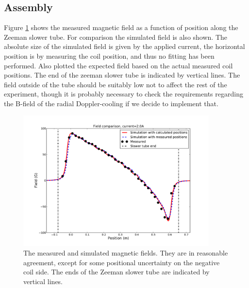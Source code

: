 \documentclass[12pt,a4paper]{article}
\begin{document}
\subsection{Assembly}

Figure \ref{fig:slowerfield} shows the measured magnetic field as a function of position along the Zeeman slower tube. For comparison the simulated field is also shown. The absolute size of the simulated field is given by the applied current, the horizontal position is by measuring the coil position, and thus no fitting has been performed. Also plotted the expected field based on the actual measured coil positions. The end of the zeeman slower tube is indicated by vertical lines. The field outside of the tube should be suitably low not to affect the rest of the experiment, though it is probably necessary to check the requirements regarding the B-field of the radial Doppler-cooling if we decide to implement that.

\begin{figure}[htb]
\centering
\includegraphics[width=0.9\textwidth]{slowerfield3}
\caption{The measured and simulated magnetic fields. They are in reasonable agreement, except for some positional uncertainty on the negative coil side. The ends of the Zeeman slower tube are indicated by vertical lines.}
\label{fig:slowerfield}
\end{figure}




\end{document}
